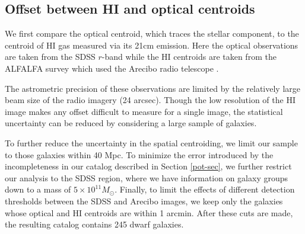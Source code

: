 \documentclass[useAMS,usenatbib,twocolumn]{mn2e}
\begin{document}
\subsection{Offset between HI and optical centroids}
\label{sec:h1-opt-offset}

We first  compare the optical centroid, which traces
the stellar component, to the centroid of HI gas measured via its 21cm emission. 
Here the optical observations are taken from the SDSS $r$-band \citep{aba09}
while the HI centroids
are taken from the ALFALFA survey which used the Arecibo radio telescope
\citep{giovanelli2005, gio07, sai08,ken08,mar09}.


The astrometric precision of these observations are limited by the
relatively large beam size of the radio imagery (24 arcsec).
Though the low resolution of the HI image makes any offset difficult to
measure for a single image,
the statistical uncertainty can be reduced by considering a large sample of
galaxies.

To further reduce the  uncertainty in the spatial centroiding,
we limit our sample to those galaxies within 40 Mpc.
To minimize the error introduced by the incompleteness in our catalog described
in Section \ref{pot-sec}, we further  restrict our analysis to the SDSS region,
where  we have information on galaxy groups down to a mass of
$5\times 10^{11}M_\odot$.  Finally, to limit the
effects of different detection thresholds between the SDSS and Arecibo
images, we keep only the galaxies whose optical and HI centroids are
within 1 arcmin.  After these cuts are made, the resulting catalog
contains 245 dwarf galaxies.
\end{document}

